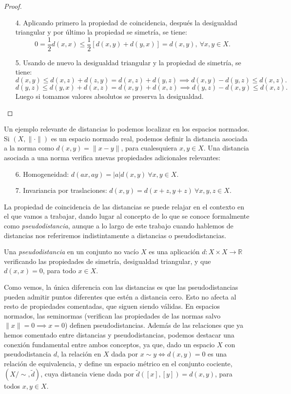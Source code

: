\begin{proof}
    \begin{enumerate}
        \item[4.] Aplicando primero la propiedad de coincidencia, después la desigualdad triangular y por último la propiedad se simetría, se tiene:
        \[0 = \frac{1}{2}d(x,x) \le \frac{1}{2}[d(x,y)+d(y,x)] = d(x,y),\ \forall x,y \in X. \]
        \item[5.] Usando de nuevo la desigualdad triangular y la propiedad de simetría, se tiene:
        \[d(x,y) \le d(x,z) + d(z,y) = d(x,z) + d(y,z) \implies d(x,y) - d(y,z) \le d(x,z).\]
        \[d(y,z) \le d(y,x) + d(x,z) = d(x,y) + d(x,z) \implies d(y,z) - d(x,y) \le d(x,z).\]
        Luego si tomamos valores absolutos se preserva la desigualdad.
    \end{enumerate}
\end{proof}

Un ejemplo relevante de distancias lo podemos localizar en los espacios normados. Si $(X, \|\cdot\|)$ es un espacio normado real, podemos definir la distancia asociada a la norma como $d(x,y) = \|x-y\|$, para cualesquiera $x, y \in X$. Una distancia asociada a una norma verifica nuevas propiedades adicionales relevantes:

\begin{enumerate}
    \item[6.] Homogeneidad: $d(ax,ay) = |a|d(x,y)\ \forall x,y \in X$.
    \item[7.] Invariancia por traslaciones: $d(x,y) = d(x+z,y+z) \ \forall x,y,z \in X$.
\end{enumerate}

La propiedad de coincidencia de las distancias se puede relajar en el contexto en el que vamos a trabajar, dando lugar al concepto de lo que se conoce formalmente como \emph{pseudodistancia}, aunque a lo largo de este trabajo cuando hablemos de distancias nos referiremos indistintamente a distancias o pseudodistancias.

\begin{definicion}
    Una \emph{pseudodistancia} en un conjunto no vacío $X$ es una aplicación $d\colon X\times X \to \mathbb{R}$ verificando las propiedades de simetría, desigualdad triangular, y que $d(x,x) = 0$, para todo $x \in X$.
\end{definicion}

Como vemos, la única diferencia con las distancias es que las pseudodistancias pueden admitir puntos diferentes que estén a distancia cero. Esto no afecta al resto de propiedades comentadas, que siguen siendo válidas. En espacios normados, las seminormas (verifican las propiedades de las normas salvo $\|x\| = 0 \implies x = 0$) definen pseudodistancias. Además de las relaciones que ya hemos comentado entre distancias y pseudodistancias, podemos destacar una conexión fundamental entre ambos conceptos, ya que, dado un espacio $X$ con pseudodistancia $d$, la relación en $X$ dada por $x \sim y \iff d(x,y) = 0$ es una relación de equivalencia, y define un espacio métrico en el conjunto cociente, $(X/\sim, \tilde{d})$, cuya distancia viene dada por $\tilde{d}([x],[y]) = d(x,y)$, para todos $x,y \in X$.

